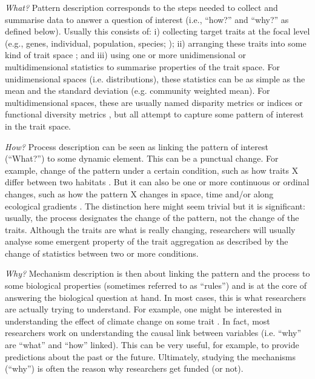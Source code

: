 \documentclass[12pt,letterpaper]{article}
\begin{document}
\textit{What?} Pattern description corresponds to the steps needed to collect and summarise data to answer a question of interest (i.e., ``how?'' and ``why?'' as defined below).
Usually this consists of: i) collecting target traits at the focal level (e.g., genes, individual, population, species; \citealt{violle2007let}); ii) arranging these traits into some kind of trait space \citep{guillerme2020disparities, mammola2021concepts}; and iii) using one or more unidimensional or multidimensional statistics to summarise properties of the trait space.
For unidimensional spaces (i.e. distributions), these statistics can be as simple as the mean and the standard deviation (e.g. community weighted mean).
For multidimensional spaces, these are usually named disparity metrics or indices \citep{guillerme2020disparities} or functional diversity metrics \citep{mammola2021concepts}, but all attempt to capture some pattern of interest in the trait space.

\textit{How?} Process description can be seen as linking the pattern of interest (``What?'') to some dynamic element.
This can be a punctual change.
For example, change of the pattern under a certain condition, such as how traits X differ between two habitats \citep{martinez2021habitat}.
But it can also be one or more continuous or ordinal changes, such as how the pattern X changes in space, time and/or along ecological gradients \citep{belmaker2013spatial, jarzyna2018taxonomic,lamanna2014functional,bjorkman2018plant,mclean2021trait}.
The distinction here might seem trivial but it is significant: usually, the process designates the change of the pattern, not the change of the traits.
Although the traits are what is really changing, researchers will usually analyse some emergent property of the trait aggregation as described by the change of statistics between two or more conditions.

\textit{Why?} Mechanism description is then about linking the pattern and the process to some biological properties (sometimes referred to as ``rules'') and is at the core of answering the biological question at hand.
In most cases, this is what researchers are actually trying to understand.
For example, one might be interested in understanding the effect of climate change on some trait \citep{boonman2022trait}.
In fact, most researchers work on understanding the causal link between variables (i.e. ``why'' are ``what'' and ``how'' linked).
This can be very useful, for example, to provide predictions about the past or the future.
Ultimately, studying the mechanisms (``why'') is often the reason why researchers get funded (or not).
\end{document}
